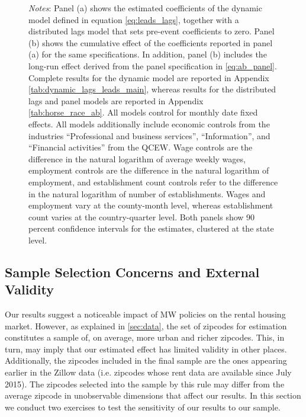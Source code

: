 \begin{figure}[htb!]
\begin{minipage}{0.95\textwidth}
		\vspace{2mm} 
		\textit{Notes}: Panel (a) shows the estimated coefficients of the dynamic model defined in 
		equation \autoref{eq:leads_lags}, together with a distributed lags model that sets pre-event 
		coefficients to zero. Panel (b) shows the cumulative effect of the coefficients reported in 
		panel (a) for the same specifications. In addition, panel (b) includes the long-run effect 
		derived from the panel specification in \autoref{eq:ab_panel}. Complete results for the 
		dynamic model are reported in  Appendix \autoref{tab:dynamic_lags_leads_main}, whereas results for the 
		distributed lags and panel models are reported in Appendix \autoref{tab:horse_race_ab}. 
		All models control for monthly date fixed effects. All models additionally  
		include economic controls from the industries ``Professional and business services'', 
		``Information'', and ``Financial activities'' from the QCEW. Wage controls are 
		the difference in the natural logarithm of average weekly wages, employment 
		controls are the difference in the natural logarithm of employment, and 
		establishment count controls refer to the difference in the natural logarithm 
		of number of establishments. Wages and employment vary at the county-month level,
		whereas establishment count varies at the country-quarter level. Both panels
		show 90 percent confidence intervals for the estimates, clustered at the state level. 
	\end{minipage}
\end{figure}


\subsection{Sample Selection Concerns and External Validity}\label{sec:sample_rest}

Our results suggest a noticeable impact of MW policies on the rental housing market. However, as 
explained in \autoref{sec:data}, the set of zipcodes for estimation constitutes a sample of, on 
average, more urban and richer zipcodes. This, in turn, may imply that our estimated effect has 
limited validity in other places. Additionally, the zipcodes included in the final sample are the 
ones appearing earlier in the Zillow data (i.e. zipcodes whose rent data are available since July 
2015). The zipcodes selected into the sample by this rule may differ from the average zipcode 
in unobservable dimensions that affect our results. In this section we conduct two exercises to 
test the sensitivity of our results to our sample.

